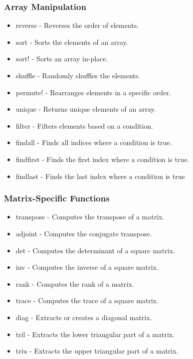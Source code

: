 \documentclass{report}
\begin{document}
    \subsubsection{Array Manipulation}
    \begin{itemize}
        \item reverse - Reverses the order of elements.
        \item sort - Sorts the elements of an array.
        \item sort! - Sorts an array in-place.
        \item shuffle - Randomly shuffles the elements.
        \item permute! - Rearranges elements in a specific order.
        \item unique - Returns unique elements of an array.
        \item filter - Filters elements based on a condition.
        \item findall - Finds all indices where a condition is true.
        \item findfirst - Finds the first index where a condition is true.
        \item findlast - Finds the last index where a condition is true
    \end{itemize}

    \bigbreak \noindent 
    \subsubsection{Matrix-Specific Functions}
    \begin{itemize}
        \item transpose - Computes the transpose of a matrix.
        \item adjoint - Computes the conjugate transpose.
        \item det - Computes the determinant of a square matrix.
        \item inv - Computes the inverse of a square matrix.
        \item rank - Computes the rank of a matrix.
        \item trace - Computes the trace of a square matrix.
        \item diag - Extracts or creates a diagonal matrix.
        \item tril - Extracts the lower triangular part of a matrix.
        \item triu - Extracts the upper triangular part of a matrix.
    \end{itemize}
\end{document}
